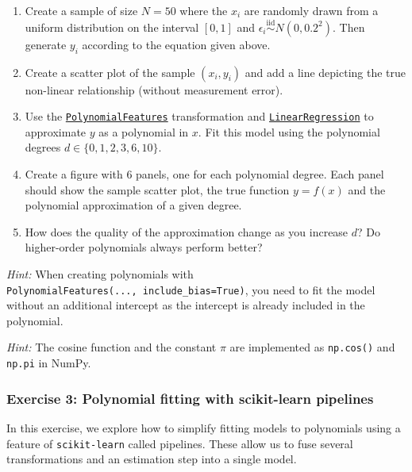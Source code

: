 \documentclass{scrartcl}
\providecommand{\tightlist}{%
      \setlength{\itemsep}{0pt}\setlength{\parskip}{0pt}}
\begin{document}
\begin{enumerate}
\def\labelenumi{\arabic{enumi}.}
\tightlist
\item
  Create a sample of size \(N=50\) where the \(x_i\) are randomly drawn
  from a uniform distribution on the interval \([0, 1]\) and
  \(\epsilon_i \stackrel{\text{iid}}{\sim} N(0, 0.2^2)\). Then generate
  \(y_i\) according to the equation given above.
\item
  Create a scatter plot of the sample \((x_i, y_i)\) and add a line
  depicting the true non-linear relationship (without measurement
  error).
\item
  Use the
  \href{https://scikit-learn.org/stable/modules/generated/sklearn.preprocessing.PolynomialFeatures.html}{\texttt{PolynomialFeatures}}
  transformation and
  \href{https://scikit-learn.org/stable/modules/generated/sklearn.linear_model.LinearRegression.html}{\texttt{LinearRegression}}
  to approximate \(y\) as a polynomial in \(x\). Fit this model using
  the polynomial degrees \(d \in \{0, 1, 2, 3, 6, 10\}\).
\item
  Create a figure with 6 panels, one for each polynomial degree. Each
  panel should show the sample scatter plot, the true function
  \(y = f(x)\) and the polynomial approximation of a given degree.
\item
  How does the quality of the approximation change as you increase
  \(d\)? Do higher-order polynomials always perform better?
\end{enumerate}

\emph{Hint:} When creating polynomials with
\texttt{PolynomialFeatures(...,\ include\_bias=True)}, you need to fit
the model without an additional intercept as the intercept is already
included in the polynomial.

\emph{Hint:} The cosine function and the constant \(\pi\) are
implemented as \texttt{np.cos()} and \texttt{np.pi} in NumPy.

    \hypertarget{exercise-3-polynomial-fitting-with-scikit-learn-pipelines}{%
\subsubsection*{Exercise 3: Polynomial fitting with scikit-learn
pipelines}\label{exercise-3-polynomial-fitting-with-scikit-learn-pipelines}}

In this exercise, we explore how to simplify fitting models to
polynomials using a feature of \texttt{scikit-learn} called pipelines.
These allow us to fuse several transformations and an estimation step
into a single model.
\end{document}
